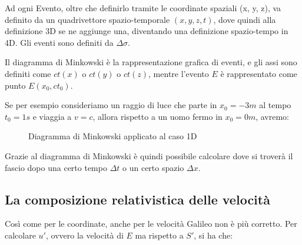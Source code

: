 Ad ogni Evento, oltre che definirlo tramite le coordinate spaziali (x, y, z), va definito da un quadrivettore spazio-temporale $(x, y, z, t)$, dove quindi alla definizione 3D se ne aggiunge una, diventando una definizione spazio-tempo in 4D.
Gli eventi sono definiti da $\Delta \sigma$.

Il diagramma di Minkowski è la rappresentazione grafica di eventi, e gli assi sono definiti come $ct(x)$ o $ct(y)$ o $ct(z)$, mentre l'evento $E$ è rappresentato come punto $E(x_0, ct_0)$.


Se per esempio consideriamo un raggio di luce che parte in $x_0 = -3m$ al tempo $t_0 = 1s$ e viaggia a $v = c$, allora rispetto a un uomo fermo in $x_0 = 0m$, avremo:

\begin{figure}[H]
    \centering
    \caption{Diagramma di Minkowski applicato al caso 1D}
\end{figure}


Grazie al diagramma di Minkowski è quindi possibile calcolare dove si troverà il fascio dopo una certo tempo $\Delta t$ o un certo spazio $\Delta x$.

\subsection{La composizione relativistica delle velocità}

Così come per le coordinate, anche per le velocità Galileo non è più corretto.
Per calcolare $u'$, ovvero la velocità di $E$ ma rispetto a $S'$, si ha che:

